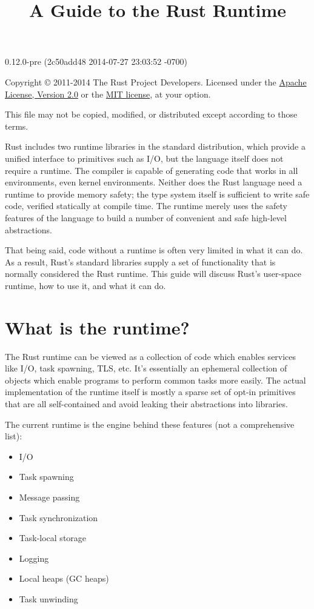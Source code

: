 \documentclass[]{article}
\title{A Guide to the Rust Runtime}
\begin{document}
\maketitle

0.12.0-pre (2c50add48 2014-07-27 23:03:52 -0700)

Copyright © 2011-2014 The Rust Project Developers. Licensed under the
\href{http://www.apache.org/licenses/LICENSE-2.0}{Apache License,
Version 2.0} or the \href{http://opensource.org/licenses/MIT}{MIT
license}, at your option.

This file may not be copied, modified, or distributed except according
to those terms.

{
\hypersetup{linkcolor=black}
\setcounter{tocdepth}{3}
\tableofcontents
}
Rust includes two runtime libraries in the standard distribution, which
provide a unified interface to primitives such as I/O, but the language
itself does not require a runtime. The compiler is capable of generating
code that works in all environments, even kernel environments. Neither
does the Rust language need a runtime to provide memory safety; the type
system itself is sufficient to write safe code, verified statically at
compile time. The runtime merely uses the safety features of the
language to build a number of convenient and safe high-level
abstractions.

That being said, code without a runtime is often very limited in what it
can do. As a result, Rust's standard libraries supply a set of
functionality that is normally considered the Rust runtime. This guide
will discuss Rust's user-space runtime, how to use it, and what it can
do.

\section{What is the runtime?}\label{what-is-the-runtime}

The Rust runtime can be viewed as a collection of code which enables
services like I/O, task spawning, TLS, etc. It's essentially an
ephemeral collection of objects which enable programs to perform common
tasks more easily. The actual implementation of the runtime itself is
mostly a sparse set of opt-in primitives that are all self-contained and
avoid leaking their abstractions into libraries.

The current runtime is the engine behind these features (not a
comprehensive list):

\begin{itemize}
\itemsep1pt\parskip0pt
\item
  I/O
\item
  Task spawning
\item
  Message passing
\item
  Task synchronization
\item
  Task-local storage
\item
  Logging
\item
  Local heaps (GC heaps)
\item
  Task unwinding
\end{itemize}
\end{document}
